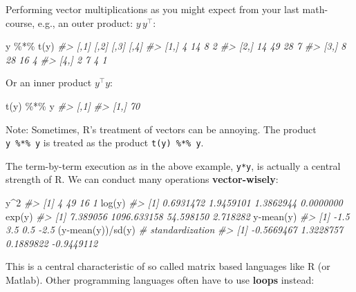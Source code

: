 \documentclass[
  14pt,
]{memoir}
\newenvironment{Shaded}{\begin{snugshade}}{\end{snugshade}}
\newcommand{\CommentTok}[1]{\textcolor[rgb]{0.56,0.35,0.01}{\textit{#1}}}
\newcommand{\DecValTok}[1]{\textcolor[rgb]{0.00,0.00,0.81}{#1}}
\newcommand{\FunctionTok}[1]{\textcolor[rgb]{0.00,0.00,0.00}{#1}}
\newcommand{\NormalTok}[1]{#1}
\newcommand{\SpecialCharTok}[1]{\textcolor[rgb]{0.00,0.00,0.00}{#1}}
\begin{document}
Performing vector multiplications as you might expect from your last math-course, e.g., an outer product: \(y\,y^\top\):

\begin{Shaded}
\begin{Highlighting}[]
\NormalTok{y }\SpecialCharTok{\%*\%} \FunctionTok{t}\NormalTok{(y)}
\CommentTok{\#\textgreater{}      [,1] [,2] [,3] [,4]}
\CommentTok{\#\textgreater{} [1,]    4   14    8    2}
\CommentTok{\#\textgreater{} [2,]   14   49   28    7}
\CommentTok{\#\textgreater{} [3,]    8   28   16    4}
\CommentTok{\#\textgreater{} [4,]    2    7    4    1}
\end{Highlighting}
\end{Shaded}

Or an inner product \(y^\top y\):

\begin{Shaded}
\begin{Highlighting}[]
\FunctionTok{t}\NormalTok{(y) }\SpecialCharTok{\%*\%}\NormalTok{ y}
\CommentTok{\#\textgreater{}      [,1]}
\CommentTok{\#\textgreater{} [1,]   70}
\end{Highlighting}
\end{Shaded}

Note: Sometimes, R's treatment of vectors can be annoying. The product \texttt{y\ \%*\%\ y} is treated as the product \texttt{t(y)\ \%*\%\ y}.

The term-by-term execution as in the above example, \texttt{y*y}, is actually a central strength of R. We can conduct many operations \textbf{vector-wisely}:

\begin{Shaded}
\begin{Highlighting}[]
\NormalTok{y}\SpecialCharTok{\^{}}\DecValTok{2}
\CommentTok{\#\textgreater{} [1]  4 49 16  1}
\FunctionTok{log}\NormalTok{(y)}
\CommentTok{\#\textgreater{} [1] 0.6931472 1.9459101 1.3862944 0.0000000}
\FunctionTok{exp}\NormalTok{(y)}
\CommentTok{\#\textgreater{} [1]    7.389056 1096.633158   54.598150    2.718282}
\NormalTok{y}\SpecialCharTok{{-}}\FunctionTok{mean}\NormalTok{(y)}
\CommentTok{\#\textgreater{} [1] {-}1.5  3.5  0.5 {-}2.5}
\NormalTok{(y}\SpecialCharTok{{-}}\FunctionTok{mean}\NormalTok{(y))}\SpecialCharTok{/}\FunctionTok{sd}\NormalTok{(y) }\CommentTok{\# standardization }
\CommentTok{\#\textgreater{} [1] {-}0.5669467  1.3228757  0.1889822 {-}0.9449112}
\end{Highlighting}
\end{Shaded}

This is a central characteristic of so called matrix based languages like R (or Matlab). Other programming languages often have to use \textbf{loops} instead:
\end{document}
